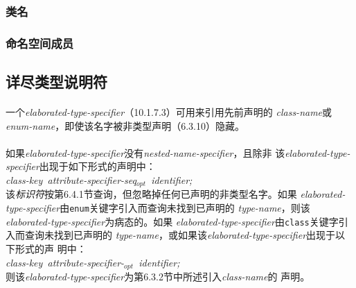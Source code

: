 \subsubsection{类名}
\subsubsection{命名空间成员}

\subsection{详尽类型说明符}
\paragraph{}
一个\textit{elaborated-type-specifier}（10.1.7.3）可用来引用先前声明的
\textit{class-name}或\textit{enum-name}，即使该名字被非类型声明（6.3.10）隐藏。

\paragraph{}
如果\textit{elaborated-type-specifier}没有\textit{nested-name-specifier}，且除非
该\textit{elaborated-type-specifier}出现于如下形式的声明中：\\
\mbox{\qquad \textit{class-key attribute-specifier-seq$_{opt}$ identifier;}} \\
该\textit{标识符}按第6.4.1节查询，但忽略掉任何已声明的非类型名字。如果
\textit{elaborated-type-specifier}由\texttt{enum}关键字引入而查询未找到已声明的
\textit{type-name}，则该\textit{elaborated-type-specifier}为病态的。如果
\textit{elaborated-type-specifier}由\texttt{class}关键字引入而查询未找到已声明的
\textit{type-name}，或如果该\textit{elaborated-type-specifier}出现于以下形式的声
明中： \\
\mbox{\qquad \textit{class-key attribute-specifier-$_{opt}$ identifier;}} \\
则该\textit{elaborated-type-specifier}为第6.3.2节中所述引入\textit{class-name}的
声明。

